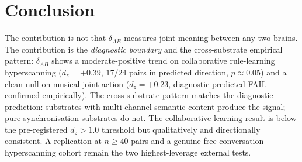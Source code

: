 \documentclass[11pt,a4paper]{article}
\begin{document}
\section{Conclusion}\label{sec:conclusion}

The contribution is not that $\delta_{AB}$ measures joint meaning between any two brains. The contribution is the \emph{diagnostic boundary} and the cross-substrate empirical pattern: $\delta_{AB}$ shows a moderate-positive trend on collaborative rule-learning hyperscanning ($d_z = +0.39$, $17/24$ pairs in predicted direction, $p \approx 0.05$) and a clean null on musical joint-action ($d_z = +0.23$, diagnostic-predicted FAIL confirmed empirically). The cross-substrate pattern matches the diagnostic prediction: substrates with multi-channel semantic content produce the signal; pure-synchronisation substrates do not. The collaborative-learning result is below the pre-registered $d_z > 1.0$ threshold but qualitatively and directionally consistent. A replication at $n \geq 40$ pairs and a genuine free-conversation hyperscanning cohort remain the two highest-leverage external tests.



\end{document}
